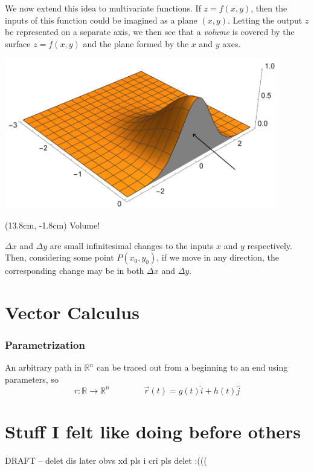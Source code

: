 \documentclass[14pt]{article}
\begin{document}
	We now extend this idea to multivariate functions. If $z = f(x, y)$, then the inputs of this function could be imagined as a plane $(x,y)$. Letting the output $z$ be represented on a separate axis, we then see that a \textit{volume} is covered by the surface $z= f(x, y)$ and the plane formed by the $x$ and $y$ axes. 
	\begin{center}
		\includegraphics[width=12cm]{3d_plot_volume_under_blue}
		\begin{textblock*}{2cm}(13.8cm, -1.8cm)
			Volume!
		\end{textblock*}
	\end{center}
	$\Delta x$ and $\Delta y$ are small infinitesimal changes to the inputs $x$ and $y$ respectively. Then, considering some point $P(x_0, y_0)$, if we move in any direction, the corresponding change may be in both $\Delta x$ and $\Delta y$. 
	
	
	\section{Vector Calculus}
	\subsubsection{Parametrization} An arbitrary path in $\mathbb{R}^n$ can be traced out from a beginning to an end using parameters, so
	\begin{equation*}
		r: \mathbb{R} \rightarrow \mathbb{R}^n \qquad\qquad \vec{r}(t) = g(t) \hat{i} + h(t) \hat{j}
	\end{equation*}
	
	\section{Stuff I felt like doing before others}
	DRAFT -- delet dis later obvs xd pls i cri pls delet :(((
	
\end{document}
